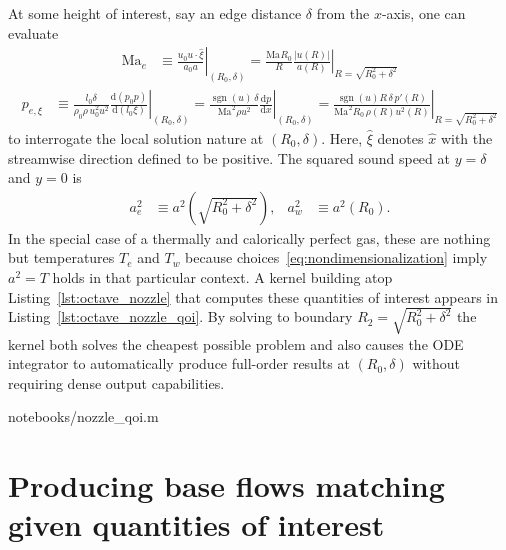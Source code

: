 \documentclass[letterpaper,11pt,nointlimits,reqno]{amsart}
\newcommand{\Mach}[1][]{\ensuremath{\mbox{Ma}_{#1}}}
\begin{document}
At some height of interest, say an edge distance $\delta$ from the $x$-axis,
one can evaluate
\begin{align}
  \Mach[e]{}
  &\equiv
  \left. \frac{u_0 u\cdot\hat{\xi}}{a_0 a} \right|_{\left(R_0,\delta\right)}
  =
  \left.
    \frac{\Mach R_0}{R}
    \frac{\left|u\!\left(R\right)\right|}
         {      a\!\left(R\right)       }
  \right|_{R = \sqrt{R_0^2 + \delta^2}}
\end{align}
\begin{align}
  p_{e,\xi}
  &\equiv
  \left.
  \frac{l_0 \delta}{\rho_0 \rho \, u_0^2 u^2}
    \frac{\mathrm{d}\left(p_0 p\right)}{\mathrm{d}\left(l_0 \xi\right)}
  \right|_{\left(R_0,\delta\right)}
  =
  \left.
    \frac{\operatorname{sgn}(u) \, \delta}{\Mach^2 \rho u^2}
      \frac{\mathrm{d}p}{\mathrm{d}x}
  \right|_{\left(R_0,\delta\right)}
  =
  \left.
    \frac{\operatorname{sgn}(u) R \, \delta \, p'\!\left(R\right)}
         {\Mach^2 R_0 \, \rho\!\left(R\right) u^2\!\left(R\right)}
  \right|_{R=\sqrt{R_0^2 + \delta^2}}
\end{align}
to interrogate the local solution nature at $\left(R_0, \delta\right)$.  Here,
$\hat{\xi}$ denotes $\hat{x}$ with the streamwise direction defined to be
positive.  The squared sound speed at $y=\delta$ and $y=0$ is
\begin{align}
  a^2_e
  &\equiv
  a^2\!\left(\sqrt{R_0^2 + \delta^2}\right)
,
&
  a^2_w
  &\equiv
  a^2\!\left(R_0\right)
.
\end{align}
In the special case of a thermally and calorically perfect gas, these are
nothing but temperatures $T_e$ and $T_w$ because
choices~\eqref{eq:nondimensionalization} imply $a^2 = T$ holds in that
particular context.  A kernel building atop Listing~\ref{lst:octave_nozzle}
that computes these quantities of interest appears in
Listing~\ref{lst:octave_nozzle_qoi}.  By solving to boundary $R_2 = \sqrt{R_0^2
+ \delta^2}$ the kernel both solves the cheapest possible problem and also
causes the ODE integrator to automatically produce full-order results at
$\left(R_0,\delta\right)$ without requiring dense output capabilities.


                {notebooks/nozzle_qoi.m}

\section{Producing base flows matching given quantities of interest}
\end{document}
